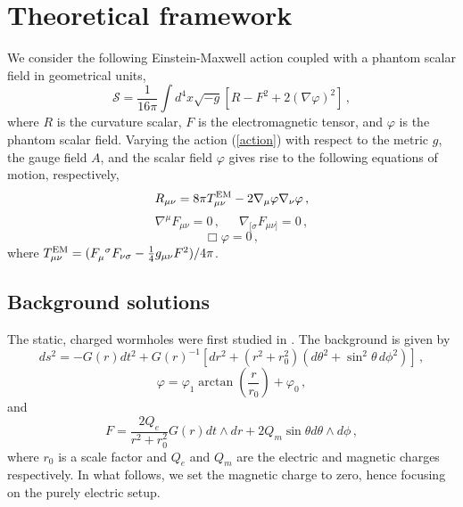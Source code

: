 \documentclass[11pt,a4paper]{article}
\begin{document}
\section{Theoretical framework}
\label{sec:TheoreticalFramework}

We consider the following Einstein-Maxwell action coupled with a phantom scalar field in geometrical units,
\begin{equation}
    \mathcal{S}=\frac{1}{16\pi}\int d^4x\sqrt{-g}\left[R-F^2+2(\nabla\varphi)^2\right] \, ,
    \label{action}
\end{equation}
where $R$ is the curvature scalar, $F$ is the electromagnetic tensor, and $\varphi$ is the phantom scalar field. 
Varying the action (\ref{action}) with respect to the metric $g$, the gauge field $A$, and the scalar field $\varphi$ gives rise to
the following equations of motion, respectively,
\begin{equation}\label{Einstein_eqs}
    R_{\mu\nu}=8\pi T^{\rm{EM}}_{\mu\nu}-2\nabla_{\mu}\varphi\nabla_{\nu}\varphi \, ,
\end{equation}
\begin{equation}\label{Maxwell_eqs}
    \nabla^{\mu}F_{\mu\nu}=0 \, , \,\,\,\,\,\,\,\,\, \nabla_{[\sigma}F_{\mu\nu]}=0 \, ,
\end{equation}
\begin{equation}\label{scalar_field_eq}
    \Box\varphi=0\, ,
\end{equation}
where $T^{\rm{EM}}_{\mu\nu}=(F_{\mu}^{\,\,\,\sigma}F_{\nu\sigma}-\frac{1}{4}g_{\mu\nu}F^2)/4\pi$. 


\subsection{Background solutions}


The static, charged wormholes were first studied in \cite{Gonzalez:2009hn}.
The background is given by
%
\begin{equation}\label{metric_b}
    ds^2=-G(r)dt^2+G(r)^{-1}\left[dr^2+(r^2+r_0^2)(d\theta^2+\sin^2{\theta}\,d\phi^2)\right]\, ,
\end{equation}
%
\begin{equation}\label{scalar_b}
    \varphi=\varphi_1\arctan{\left(\frac{r}{r_0}\right)}+\varphi_0 \, ,
\end{equation}
%
and
%
\begin{equation}\label{F_exp}
    F=\frac{2Q_e}{r^2+r_0^2}G(r)dt\wedge dr+2Q_m\sin{\theta}d\theta\wedge d\phi\, ,
\end{equation}
%
where $r_0$ is a scale factor and $Q_e$ and $Q_m$ are the electric and magnetic charges respectively.
In what follows, we set the magnetic charge  to zero, hence focusing on the purely electric setup.
\end{document}
